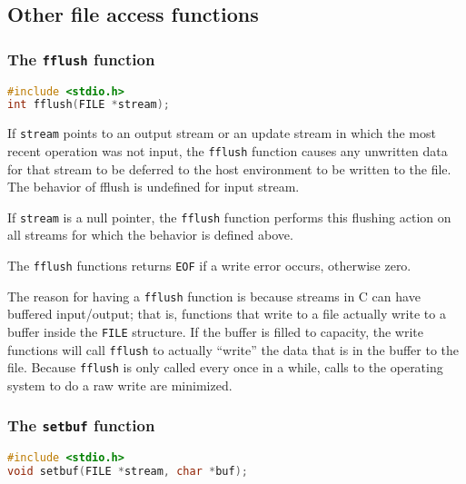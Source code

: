 \subsection{Other file access functions}
\subsubsection{The \texttt{fflush} function}
\lstset{basicstyle=\scriptsize, numbers=left, captionpos=b, tabsize=4}
\begin{lstlisting}[caption=Section \thesection listing \arabic{filecnt},language={C},
breaklines=true,xleftmargin=15pt,label=lst:section\thesection listing\arabic{filecnt}]
#include <stdio.h>
int fflush(FILE *stream);
\end{lstlisting}

If \texttt{stream} points to an output stream or an update stream in which the
most recent operation was not input, the \texttt{fflush} function causes any
unwritten data for that stream to be deferred to the host environment to be
written to the file. The behavior of fflush is undefined for input stream.

If \texttt{stream} is a null pointer, the \texttt{fflush} function performs
this flushing action on all streams for which the behavior is defined above.

The \texttt{fflush} functions returns \texttt{EOF} if a write error occurs,
otherwise zero.

The reason for having a \texttt{fflush} function is because streams in C can
have buffered input/output; that is, functions that write to a file actually
write to a buffer inside the \texttt{FILE} structure. If the buffer is filled
to capacity, the write functions will call \texttt{fflush} to actually
``write'' the data that is in the buffer to the file. Because \texttt{fflush}
is only called every once in a while, calls to the operating system to do a raw
write are minimized.

\subsubsection{The \texttt{setbuf} function}
\lstset{basicstyle=\scriptsize, numbers=left, captionpos=b, tabsize=4}
\begin{lstlisting}[caption=Section \thesection listing \arabic{filecnt},language={C},
breaklines=true,xleftmargin=15pt,label=lst:section\thesection listing\arabic{filecnt}]
#include <stdio.h>
void setbuf(FILE *stream, char *buf);
\end{lstlisting}

